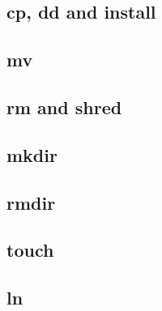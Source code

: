 
\subsection{cp, dd and install}

\subsection{mv}

\subsection{rm and shred}

\subsection{mkdir}

\subsection{rmdir}

\subsection{touch}

\subsection{ln}

